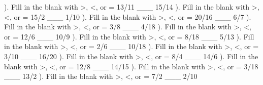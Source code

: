 \documentclass{article}%
\begin{document}
\newline%
\newline%
). Fill in the blank with >, <, or = 13/11 \_\_\_ 15/14%
\newline%
\newline%
). Fill in the blank with >, <, or = 15/2 \_\_\_ 1/10%
\newline%
\newline%
). Fill in the blank with >, <, or = 20/16 \_\_\_ 6/7%
\newline%
\newline%
). Fill in the blank with >, <, or = 3/8 \_\_\_ 4/18%
\newline%
\newline%
). Fill in the blank with >, <, or = 12/6 \_\_\_ 10/9%
\newline%
\newline%
). Fill in the blank with >, <, or = 8/18 \_\_\_ 5/13%
\newline%
\newline%
). Fill in the blank with >, <, or = 2/6 \_\_\_ 10/18%
\newline%
\newline%
). Fill in the blank with >, <, or = 3/10 \_\_\_ 16/20%
\newline%
\newline%
). Fill in the blank with >, <, or = 8/4 \_\_\_ 14/6%
\newline%
\newline%
). Fill in the blank with >, <, or = 12/8 \_\_\_ 14/15%
\newline%
\newline%
). Fill in the blank with >, <, or = 3/18 \_\_\_ 13/2%
\newline%
\newline%
). Fill in the blank with >, <, or = 7/2 \_\_\_ 2/10%
\newline%
\newline%
\newline%
\end{document}
